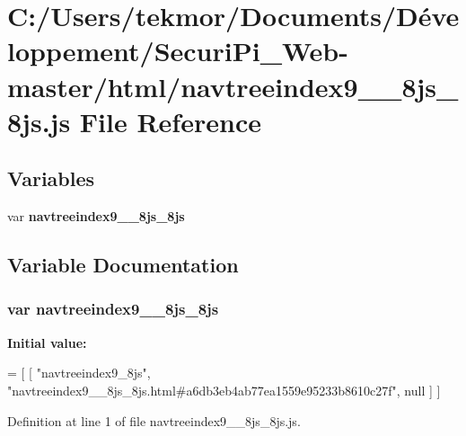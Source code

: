 \section{C\+:/\+Users/tekmor/\+Documents/\+Développement/\+Securi\+Pi\+\_\+\+Web-\/master/html/navtreeindex9\+\_\+\+\_\+8js\+\_\+8js.js File Reference}
\label{navtreeindex9____8js__8js_8js}
\subsection*{Variables}
\begin{DoxyCompactItemize}
\item 
var {\bf navtreeindex9\+\_\+\+\_\+8js\+\_\+8js}
\end{DoxyCompactItemize}


\subsection{Variable Documentation}
\subsubsection[{navtreeindex9\+\_\+\+\_\+8js\+\_\+8js}]{\setlength{\rightskip}{0pt plus 5cm}var navtreeindex9\+\_\+\+\_\+8js\+\_\+8js}\label{navtreeindex9____8js__8js_8js_abb9527021e92a9c77a5629b657d3afa9}
{\bfseries Initial value\+:}
\begin{DoxyCode}
=
[
    [ \textcolor{stringliteral}{"navtreeindex9\_8js"}, \textcolor{stringliteral}{"navtreeindex9\_\_8js\_8js.html#a6db3eb4ab77ea1559e95233b8610c27f"}, null ]
]
\end{DoxyCode}


Definition at line 1 of file navtreeindex9\+\_\+\+\_\+8js\+\_\+8js.\+js.

